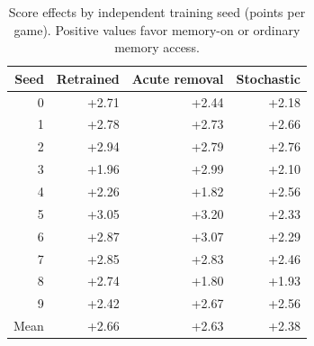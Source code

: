 \begin{table}[t]
\centering
\caption{Score effects by independent training seed (points per game). Positive values favor memory-on or ordinary memory access.}
\label{tab:memory}
\begin{tabular}{rrrr}
\toprule
Seed & Retrained & Acute removal & Stochastic \\
\midrule
0 & +2.71 & +2.44 & +2.18 \\
1 & +2.78 & +2.73 & +2.66 \\
2 & +2.94 & +2.79 & +2.76 \\
3 & +1.96 & +2.99 & +2.10 \\
4 & +2.26 & +1.82 & +2.56 \\
5 & +3.05 & +3.20 & +2.33 \\
6 & +2.87 & +3.07 & +2.29 \\
7 & +2.85 & +2.83 & +2.46 \\
8 & +2.74 & +1.80 & +1.93 \\
9 & +2.42 & +2.67 & +2.56 \\
\midrule
Mean & +2.66 & +2.63 & +2.38 \\
\bottomrule
\end{tabular}
\end{table}
